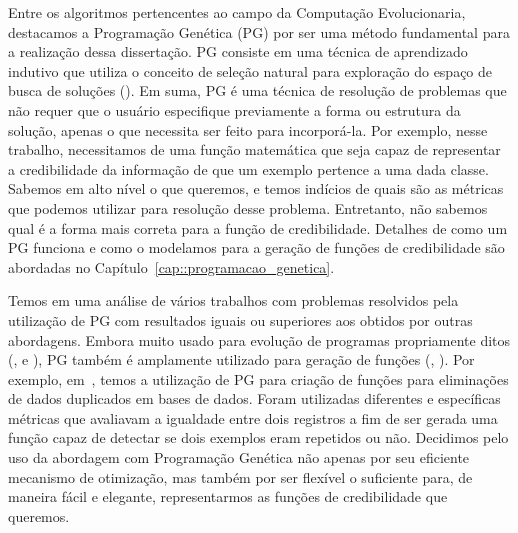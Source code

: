 Entre os algoritmos pertencentes ao campo da Computação Evolucionaria, destacamos a Programação Genética (\textsc{PG}) por ser uma método fundamental para a realização dessa dissertação. \textsc{PG} consiste em uma técnica de aprendizado indutivo que utiliza o conceito de seleção natural para exploração do espaço de busca de soluções (\cite{Koza92}).
Em suma, \textsc{PG} é uma técnica de resolução de problemas que não requer que o usuário especifique previamente a forma ou estrutura da solução, apenas o que necessita ser feito para incorporá-la.
Por exemplo, nesse trabalho, necessitamos de uma função matemática que seja capaz de representar a credibilidade da informação de que um exemplo pertence a uma dada classe.
Sabemos em alto nível o que queremos, e temos indícios de quais são as métricas que podemos utilizar para resolução desse problema. Entretanto, não sabemos qual é a forma mais correta para a função de credibilidade. Detalhes de como um \textsc{PG} funciona e como o modelamos para a geração de funções de credibilidade são abordadas no Capítulo~\ref{cap::programacao_genetica}.

Temos em \cite{Koza10} uma análise de vários trabalhos com problemas resolvidos pela utilização de \textsc{PG} com resultados iguais ou superiores aos obtidos por outras abordagens.
Embora muito usado para evolução de programas propriamente ditos (\cite{Spector98}, \cite{Hauptman07} e \cite{Forrest09}),
\textsc{PG} também é amplamente utilizado para geração de funções (\cite{Golubski02}, \cite{Freitas10}). 
Por exemplo, em~\cite{Freitas10}, temos a utilização de \textsc{PG} para criação de funções para eliminações de dados duplicados em bases de dados. Foram utilizadas diferentes e específicas métricas que avaliavam a igualdade entre dois registros a fim de ser gerada uma função capaz de detectar se dois exemplos eram repetidos ou não.
Decidimos pelo uso da abordagem com Programação Genética não apenas por seu eficiente mecanismo de otimização, mas também por ser flexível o suficiente para, de maneira fácil e elegante, representarmos as funções de credibilidade que queremos.


